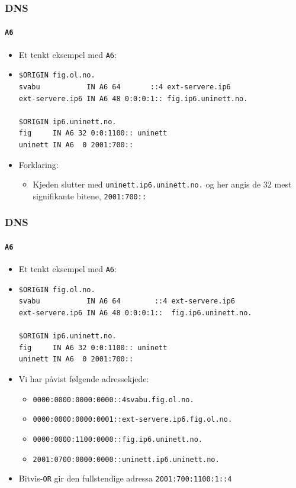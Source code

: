 \begin{frame}[fragile]%
  \frametitle{DNS}
  \framesubtitle{\texttt{A6}}
  \begin{itemize}%
  \item Et tenkt eksempel med \texttt{A6}:
  \item 
\begin{verbatim}
$ORIGIN fig.ol.no.
svabu           IN A6 64       ::4 ext-servere.ip6
ext-servere.ip6 IN A6 48 0:0:0:1:: fig.ip6.uninett.no.

$ORIGIN ip6.uninett.no.
fig     IN A6 32 0:0:1100:: uninett
uninett IN A6  0 2001:700::
\end{verbatim}
  \item Forklaring:
    \begin{itemize}%
    \item Kjeden slutter med \texttt{uninett.ip6.uninett.no.} og her
      angis de 32 mest signifikante bitene, \texttt{2001:700::}
    \end{itemize}
  \end{itemize}
\end{frame}

\begin{frame}[fragile]%
  \frametitle{DNS}
  \framesubtitle{\texttt{A6}}
  \begin{itemize}%
  \item Et tenkt eksempel med \texttt{A6}:
  \item 
\begin{verbatim}
$ORIGIN fig.ol.no.
svabu           IN A6 64        ::4 ext-servere.ip6
ext-servere.ip6 IN A6 48 0:0:0:1::  fig.ip6.uninett.no.

$ORIGIN ip6.uninett.no.
fig     IN A6 32 0:0:1100:: uninett
uninett IN A6  0 2001:700::
\end{verbatim}
    \item Vi har påvist følgende adressekjede:
      \begin{itemize}%
      \item \texttt{0000:0000:0000:0000::\alert{4}}\hfill\texttt{svabu.fig.ol.no.}
      \item \texttt{0000:0000:0000:000\alert{1}::}\hfill\texttt{ext-servere.ip6.fig.ol.no.}
      \item \texttt{0000:0000:\alert{1100}:0000::}\hfill\texttt{fig.ip6.uninett.no.}
      \item \texttt{\alert{2001}:0\alert{700}:0000:0000::}\hfill\texttt{uninett.ip6.uninett.no.}
      \end{itemize}
    \item Bitvis-\texttt{OR} gir den fullstendige adressa \texttt{2001:700:1100:1::4}
  \end{itemize}
\end{frame}

